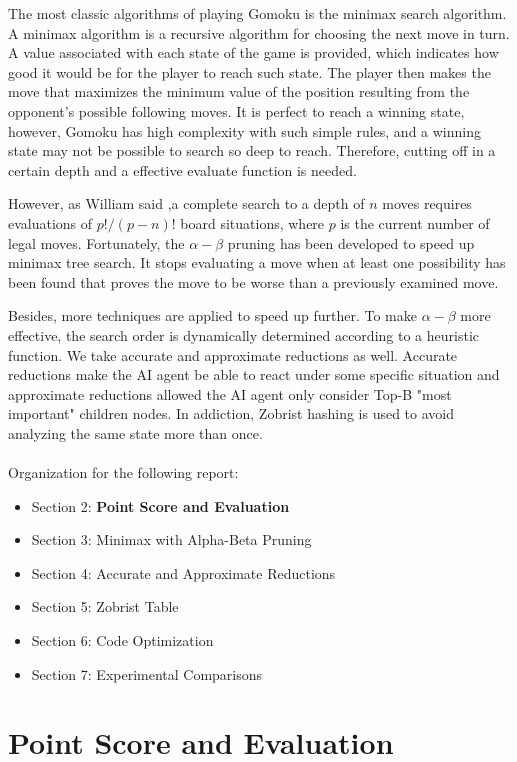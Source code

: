 \documentclass[final]{cvpr}
\begin{document}
The most classic algorithms of playing Gomoku is the minimax search algorithm.
%
A minimax algorithm is a recursive algorithm 
for choosing the next move in turn. 
%
A value associated with each state of the game is provided, 
which indicates how good it would be for the player to reach such state.
%
The player then makes the move that maximizes the minimum value 
of the position resulting from the opponent's possible following moves.
%
It is perfect to reach a winning state, however, Gomoku has high
complexity with such simple rules, 
and a winning state may not be possible to search so deep to reach.
%
Therefore, cutting off in a certain depth and a effective evaluate function is needed.
%

However, as William said \cite{91ieee/wt},a complete search to a depth of $n$ moves 
requires evaluations of $p!/(p-n)!$ board situations, where $p$ is the 
current number of legal moves. 
%
Fortunately, the $\alpha-\beta$ pruning has been developed
to speed up minimax tree search. 
%
It stops evaluating a move when at least one possibility
has been found that proves the move to be worse than a previously examined move. 

Besides, more techniques are applied to speed up further.
%
To make $\alpha-\beta$ more effective, the search order is dynamically determined according to a heuristic function. 
%
We take accurate and approximate reductions as well. 
%
Accurate reductions make the AI agent be able to react under some specific situation and approximate reductions allowed the AI agent only consider Top-B "most important" children nodes. 
%
In addiction, Zobrist hashing is used to avoid analyzing the same state more than once. 
\\
\\
\noindent Organization for the following report:
\begin{itemize}
\item Section 2: \textbf{Point Score and Evaluation}
\item Section 3: Minimax with Alpha-Beta Pruning
\item Section 4: Accurate and Approximate Reductions
\item Section 5: Zobrist Table
\item Section 6: Code Optimization
\item Section 7: Experimental Comparisons
\end{itemize}

\section{Point Score and Evaluation}\label{sec:Evaluation}
\end{document}

